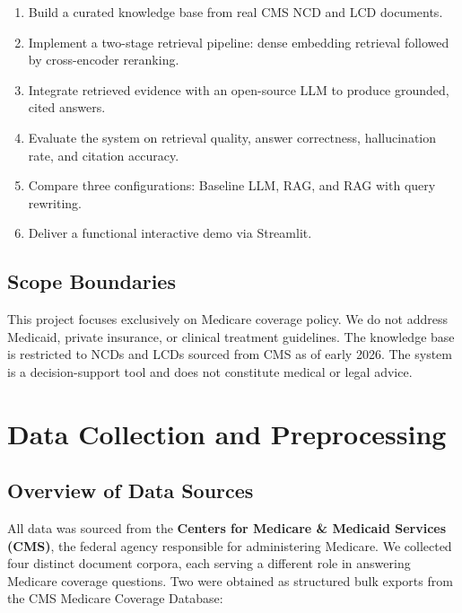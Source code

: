 \documentclass[12pt, letterpaper]{article}
\begin{document}
\begin{enumerate}[noitemsep, topsep=4pt]
    \item Build a curated knowledge base from real CMS NCD and LCD documents.
    \item Implement a two-stage retrieval pipeline: dense embedding retrieval followed
          by cross-encoder reranking.
    \item Integrate retrieved evidence with an open-source LLM to produce grounded,
          cited answers.
    \item Evaluate the system on retrieval quality, answer correctness, hallucination
          rate, and citation accuracy.
    \item Compare three configurations: Baseline LLM, RAG, and RAG with query rewriting.
    \item Deliver a functional interactive demo via Streamlit.
\end{enumerate}

\subsection{Scope Boundaries}

This project focuses exclusively on Medicare coverage policy. We do not address Medicaid,
private insurance, or clinical treatment guidelines. The knowledge base is restricted to
NCDs and LCDs sourced from CMS as of early 2026. The system is a decision-support tool
and does not constitute medical or legal advice.


\section{Data Collection and Preprocessing}

\subsection{Overview of Data Sources}

All data was sourced from the \textbf{Centers for Medicare \& Medicaid Services (CMS)},
the federal agency responsible for administering Medicare. We collected four distinct
document corpora, each serving a different role in answering Medicare coverage questions.
Two were obtained as structured bulk exports from the CMS Medicare Coverage Database:
\end{document}
